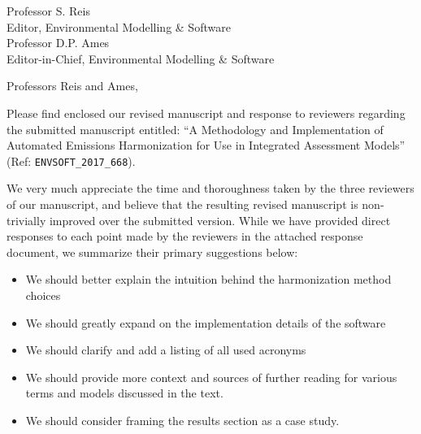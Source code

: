 \documentclass[11pt]{letter} %
\begin{document}

\begin{letter}{
    Professor S. Reis\\
    Editor, Environmental Modelling \& Software\\
    \hfill\break
    Professor D.P. Ames\\
    Editor-in-Chief, Environmental Modelling \& Software
    \hfill\break
  }


\address{Matthew Gidden\\
Laimgrubengasse 17/7\\
Vienna, Austria 1060}


\opening{Professors Reis and Ames,}

Please find enclosed our revised manuscript and response to reviewers regarding
the submitted manuscript entitled: ``A Methodology and Implementation of
Automated Emissions Harmonization for Use in Integrated Assessment Models''
(Ref: \texttt{ENVSOFT\_2017\_668}).

We very much appreciate the time and thoroughness taken by the three reviewers
of our manuscript, and believe that the resulting revised manuscript is
non-trivially improved over the submitted version. While we have provided direct
responses to each point made by the reviewers in the attached response document,
we summarize their primary suggestions below:

\begin{itemize}
\item We should better explain the intuition behind the harmonization method choices
\item We should greatly expand on the implementation details of the software
\item We should clarify and add a listing of all used acronyms
\item We should provide more context and sources of further reading for various terms and models discussed in the text.
\item We should consider framing the results section as a case study.
\end{itemize}


\end{letter}
\end{document}
